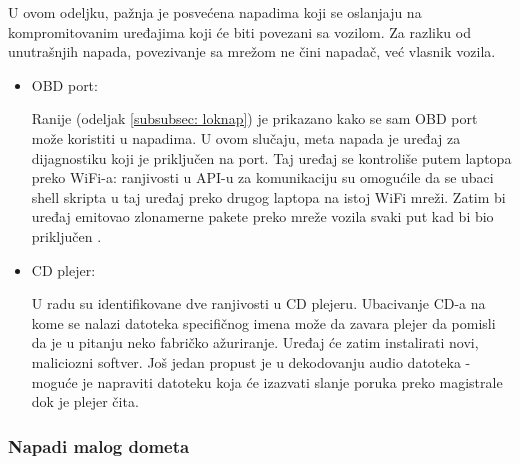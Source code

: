 \documentclass[a4paper]{article}
\begin{document}
  U ovom odeljku, pažnja je posvećena napadima koji se oslanjaju na kompromitovanim uređajima koji će biti povezani sa vozilom. Za razliku od unutrašnjih napada, povezivanje sa mrežom ne čini napadač, već vlasnik vozila.

\begin{itemize}
  	\item OBD port:
    
    Ranije (odeljak \ref{subsubsec: loknap}) je prikazano kako se sam OBD port može koristiti u napadima. U ovom slučaju, meta napada je uređaj za dijagnostiku koji je priključen na port. Taj uređaj se kontroliše putem laptopa preko WiFi-a: ranjivosti u API-u za komunikaciju su omogućile da se ubaci shell skripta u taj uređaj preko drugog laptopa na istoj WiFi mreži. Zatim bi uređaj emitovao zlonamerne pakete preko mreže vozila svaki put kad bi bio priključen \cite{Checkoway}.
    
	\item CD plejer:
    
    U radu \cite{Checkoway} su identifikovane dve ranjivosti u CD plejeru. Ubacivanje CD-a na kome se nalazi datoteka specifičnog imena može da zavara plejer da pomisli da je u pitanju neko fabričko ažuriranje. Uređaj će zatim instalirati novi, maliciozni softver. Još jedan propust je u dekodovanju audio datoteka - moguće je napraviti datoteku koja će izazvati slanje poruka preko magistrale dok je plejer čita.

    

  \end{itemize}
  
\subsubsection{Napadi malog dometa}
\label{subsubsec:napadimalo}
\end{document}

